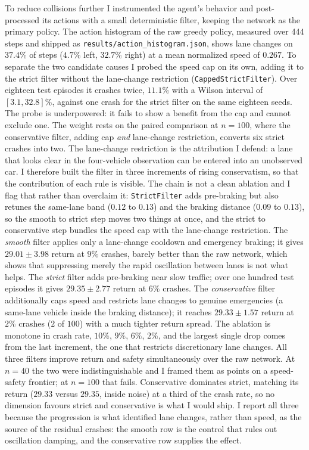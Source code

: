 \documentclass{article}
\begin{document}
To reduce collisions further I instrumented the agent's behavior and post-processed its actions with a small deterministic filter, keeping the network as the primary policy. The action histogram of the raw greedy policy, measured over 444 steps and shipped as \texttt{results/action\_histogram.json}, shows lane changes on $37.4\%$ of steps ($4.7\%$ left, $32.7\%$ right) at a mean normalized speed of $0.267$. To separate the two candidate causes I probed the speed cap on its own, adding it to the strict filter without the lane-change restriction (\texttt{CappedStrictFilter}). Over eighteen test episodes it crashes twice, $11.1\%$ with a Wilson interval of $[3.1, 32.8]\%$, against one crash for the strict filter on the same eighteen seeds. The probe is underpowered: it fails to show a benefit from the cap and cannot exclude one. The weight rests on the paired comparison at $n{=}100$, where the conservative filter, adding cap \emph{and} lane-change restriction, converts six strict crashes into two. The lane-change restriction is the attribution I defend: a lane that looks clear in the four-vehicle observation can be entered into an unobserved car. I therefore built the filter in three increments of rising conservatism, so that the contribution of each rule is visible. The chain is not a clean ablation and I flag that rather than overclaim it: \texttt{StrictFilter} adds pre-braking but also retunes the same-lane band ($0.12$ to $0.13$) and the braking distance ($0.09$ to $0.13$), so the smooth to strict step moves two things at once, and the strict to conservative step bundles the speed cap with the lane-change restriction. The \emph{smooth} filter applies only a lane-change cooldown and emergency braking; it gives $29.01\pm3.98$ return at $9\%$ crashes, barely better than the raw network, which shows that suppressing merely the rapid oscillation between lanes is not what helps. The \emph{strict} filter adds pre-braking near slow traffic; over one hundred test episodes it gives $29.35\pm2.77$ return at $6\%$ crashes. The \emph{conservative} filter additionally caps speed and restricts lane changes to genuine emergencies (a same-lane vehicle inside the braking distance); it reaches $29.33\pm1.57$ return at $2\%$ crashes ($2$ of $100$) with a much tighter return spread. The ablation is monotone in crash rate, $10\%$, $9\%$, $6\%$, $2\%$, and the largest single drop comes from the last increment, the one that restricts discretionary lane changes. All three filters improve return and safety simultaneously over the raw network. At $n{=}40$ the two were indistinguishable and I framed them as points on a speed-safety frontier; at $n{=}100$ that fails. Conservative dominates strict, matching its return ($29.33$ versus $29.35$, inside noise) at a third of the crash rate, so no dimension favours strict and conservative is what I would ship. I report all three because the progression is what identified lane changes, rather than speed, as the source of the residual crashes: the smooth row is the control that rules out oscillation damping, and the conservative row supplies the effect.
\end{document}
